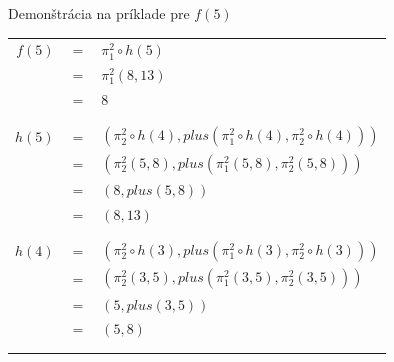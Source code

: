 \documentclass[11pt,a4paper]{article}
\begin{document}
Demonštrácia na príklade pre $f(5)$

\begin{center}
\begin{tabular}{rcl}
$f(5)$ & \hspace{-3mm}$=$\hspace{-3mm} & $\pi_1^2 \circ h(5)$\\
       & \hspace{-3mm}$=$\hspace{-3mm} & $\pi_1^2 (8,13)$\\
       & \hspace{-3mm}$=$\hspace{-3mm} & $8$\\
\\[-0.9em]
\hline\\[-0.75em]
$h(5)$ & \hspace{-3mm}$=$\hspace{-3mm} & $(\pi_2^2 \circ h(4), plus(\pi_1^2 \circ h(4),\pi_2^2 \circ h(4)))$\\
       & \hspace{-3mm}$=$\hspace{-3mm} & $(\pi_2^2 (5, 8), plus(\pi_1^2 (5, 8),\pi_2^2 (5, 8)))$\\
       & \hspace{-3mm}$=$\hspace{-3mm} & $(8, plus(5,8))$\\
       & \hspace{-3mm}$=$\hspace{-3mm} & $(8,13)$\\
\\[-0.9em]
\hline\\[-0.75em]
$h(4)$ & \hspace{-3mm}$=$\hspace{-3mm} & $(\pi_2^2 \circ h(3), plus(\pi_1^2 \circ h(3),\pi_2^2 \circ h(3)))$\\
       & \hspace{-3mm}$=$\hspace{-3mm} & $(\pi_2^2 (3, 5), plus(\pi_1^2 (3, 5),\pi_2^2 (3, 5)))$\\
       & \hspace{-3mm}$=$\hspace{-3mm} & $(5, plus(3,5))$\\
       & \hspace{-3mm}$=$\hspace{-3mm} & $(5,8)$\\
\\[-0.9em]
\hline\\[-0.75em]

\end{tabular}
\end{center}
\end{document}
